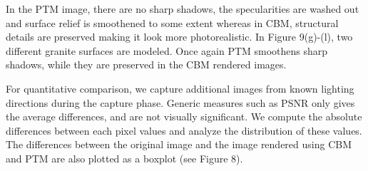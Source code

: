 In the PTM image, there are no sharp shadows, the specularities are washed out
and surface relief is smoothened to some extent whereas in CBM, structural
details are preserved making it look more photorealistic. In Figure 9(g)-(l),
two different granite surfaces are modeled. Once again PTM smoothens sharp
shadows, while they are preserved in the CBM rendered images.

For quantitative comparison, we capture additional images from known lighting
directions during the capture phase. Generic measures such as PSNR only gives
the average differences, and are not visually significant. We compute the
absolute differences between each pixel values and analyze the distribution of
these values. The differences between the original image and the image rendered
using CBM and PTM are also plotted as a boxplot (see Figure 8).


